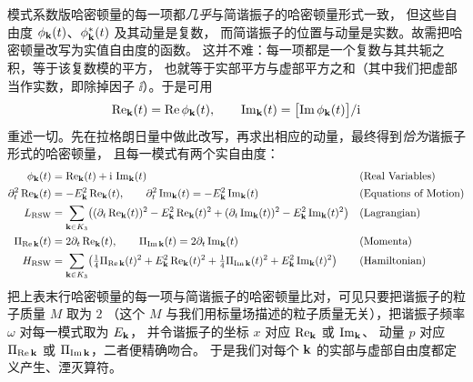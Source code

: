 模式系数版哈密顿量的每一项都\emph{几乎}与简谐振子的哈密顿量形式一致，
但这些自由度 $\phi_{\mathbf{k}}(t)$、$\phi^{*}_{\mathbf{k}}(t)$ 及其动量是复数，
而简谐振子的位置与动量是实数。故需把哈密顿量改写为实值自由度的函数。
这并不难：每一项都是一个复数与其共轭之积，等于该复数模的平方，
也就等于实部平方与虚部平方之和（其中我们把虚部当作实数，即除掉因子 $\ii$）。于是可用
\begin{equation*}
\operatorname{Re}_{\mathbf{k}}(t)=\operatorname{Re}\phi_{\mathbf{k}}(t),\qquad
\operatorname{Im}_{\mathbf{k}}(t)=\bigl[\operatorname{Im}\phi_{\mathbf{k}}(t)\bigr]/\mathrm{i}
\end{equation*}
重述一切。先在拉格朗日量中做此改写，再求出相应的动量，最终得到\emph{恰为}谐振子形式的哈密顿量，
且每一模式有两个实自由度：
\begin{align}
\phi_{\mathbf{k}}(t)&=\operatorname{Re}_{\mathbf{k}}(t)+\mathrm{i}\,\operatorname{Im}_{\mathbf{k}}(t)
&&\text{(Real Variables)}\\
\partial_{t}^{2}\operatorname{Re}_{\mathbf{k}}(t)&=-E_{\mathbf{k}}^{2}\operatorname{Re}_{\mathbf{k}}(t),\qquad
\partial_{t}^{2}\operatorname{Im}_{\mathbf{k}}(t)=-E_{\mathbf{k}}^{2}\operatorname{Im}_{\mathbf{k}}(t)
&&\text{(Equations of Motion)}\\
L_{\text{RSW}}&=\sum_{\mathbf{k}\in K_{3}}\bigl((\partial_{t}\operatorname{Re}_{\mathbf{k}}(t))^{2}
-E_{\mathbf{k}}^{2}\operatorname{Re}_{\mathbf{k}}(t)^{2}
+(\partial_{t}\operatorname{Im}_{\mathbf{k}}(t))^{2}-E_{\mathbf{k}}^{2}\operatorname{Im}_{\mathbf{k}}(t)^{2}\bigr)
&&\text{(Lagrangian)}\\
\Pi_{\operatorname{Re}\mathbf{k}}(t)&=2\partial_{t}\operatorname{Re}_{\mathbf{k}}(t),\qquad
\Pi_{\operatorname{Im}\mathbf{k}}(t)=2\partial_{t}\operatorname{Im}_{\mathbf{k}}(t)
&&\text{(Momenta)}\\
H_{\text{RSW}}&=\sum_{\mathbf{k}\in K_{3}}\bigl(\tfrac14\Pi_{\operatorname{Re}\mathbf{k}}(t)^{2}
+E_{\mathbf{k}}^{2}\operatorname{Re}_{\mathbf{k}}(t)^{2}
+\tfrac14\Pi_{\operatorname{Im}\mathbf{k}}(t)^{2}+E_{\mathbf{k}}^{2}\operatorname{Im}_{\mathbf{k}}(t)^{2}\bigr)
&&\text{(Hamiltonian)}
\end{align}
把上表末行哈密顿量的每一项与简谐振子的哈密顿量比对，可见只要把谐振子的粒子质量 $M$ 取为 $2$
（这个 $M$ 与我们用标量场描述的粒子质量无关），把谐振子频率 $\omega$ 对每一模式取为 $E_{\mathbf{k}}$，
并令谐振子的坐标 $x$ 对应 $\operatorname{Re}_{\mathbf{k}}$ 或 $\operatorname{Im}_{\mathbf{k}}$、
动量 $p$ 对应 $\Pi_{\operatorname{Re}\mathbf{k}}$ 或 $\Pi_{\operatorname{Im}\mathbf{k}}$，二者便精确吻合。
于是我们对每个 $\mathbf{k}$ 的实部与虚部自由度都定义产生、湮灭算符。

